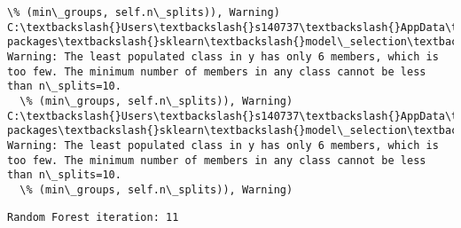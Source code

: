 \documentclass[11pt]{article}
\begin{document}
\begin{Verbatim}[commandchars=\\\{\}]
  \% (min\_groups, self.n\_splits)), Warning)
C:\textbackslash{}Users\textbackslash{}s140737\textbackslash{}AppData\textbackslash{}Local\textbackslash{}Continuum\textbackslash{}anaconda3\textbackslash{}lib\textbackslash{}site-packages\textbackslash{}sklearn\textbackslash{}model\_selection\textbackslash{}\_split.py:605: Warning: The least populated class in y has only 6 members, which is too few. The minimum number of members in any class cannot be less than n\_splits=10.
  \% (min\_groups, self.n\_splits)), Warning)
C:\textbackslash{}Users\textbackslash{}s140737\textbackslash{}AppData\textbackslash{}Local\textbackslash{}Continuum\textbackslash{}anaconda3\textbackslash{}lib\textbackslash{}site-packages\textbackslash{}sklearn\textbackslash{}model\_selection\textbackslash{}\_split.py:605: Warning: The least populated class in y has only 6 members, which is too few. The minimum number of members in any class cannot be less than n\_splits=10.
  \% (min\_groups, self.n\_splits)), Warning)

    \end{Verbatim}

    \begin{Verbatim}[commandchars=\\\{\}]
Random Forest iteration: 11 

    \end{Verbatim}
\end{document}
